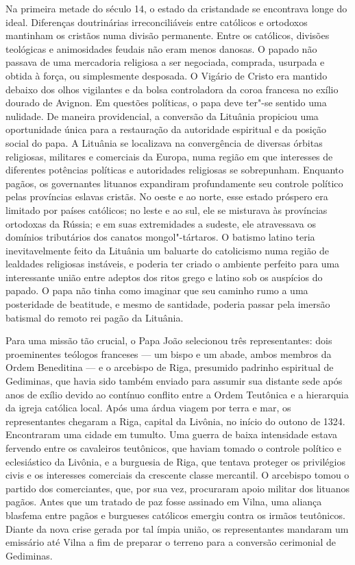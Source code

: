 Na primeira metade do século 14, o estado da cristandade se encontrava
longe do ideal. Diferenças doutrinárias irreconciliáveis entre católicos
e ortodoxos mantinham os cristãos numa divisão permanente. Entre os
católicos, divisões teológicas e animosidades feudais não eram menos
danosas. O papado não passava de uma mercadoria religiosa a ser
negociada, comprada, usurpada e obtida à força, ou simplesmente
desposada. O Vigário de Cristo era mantido debaixo dos olhos vigilantes
e da bolsa controladora da coroa francesa no exílio dourado de Avignon.
Em questões políticas, o papa deve ter"-se sentido uma nulidade. De
maneira providencial, a conversão da Lituânia propiciou uma oportunidade
única para a restauração da autoridade espiritual e da posição social do
papa. A Lituânia se localizava na convergência de diversas órbitas
religiosas, militares e comerciais da Europa, numa região em que
interesses de diferentes potências políticas e autoridades religiosas se
sobrepunham. Enquanto pagãos, os governantes lituanos expandiram
profundamente seu controle político pelas províncias eslavas cristãs. No
oeste e ao norte, esse estado próspero era limitado por países
católicos; no leste e ao sul, ele se misturava às províncias ortodoxas
da Rússia; e em suas extremidades a sudeste, ele atravessava os domínios
tributários dos canatos mongol"-tártaros. O batismo latino teria
inevitavelmente feito da Lituânia um baluarte do catolicismo numa região
de lealdades religiosas instáveis, e poderia ter criado o ambiente
perfeito para uma interessante união entre adeptos dos ritos grego e
latino sob os auspícios do papado. O papa não tinha como imaginar que
seu caminho rumo a uma posteridade de beatitude, e mesmo de santidade,
poderia passar pela imersão batismal do remoto rei pagão da Lituânia.

%

Para uma missão tão crucial, o Papa João  selecionou três
representantes: dois proeminentes teólogos franceses --- um bispo e um
abade, ambos membros da Ordem Beneditina --- e o arcebispo de Riga,
presumido padrinho espiritual de Gediminas, que havia sido também
enviado para assumir sua distante sede após anos de exílio devido ao
contínuo conflito entre a Ordem Teutônica e a hierarquia da igreja
católica local. Após uma árdua viagem por terra e mar, os representantes
chegaram a Riga, capital da Livônia, no início do outono de 1324.
Encontraram uma cidade em tumulto. Uma guerra de baixa intensidade
estava fervendo entre os cavaleiros teutônicos, que haviam tomado o
controle político e eclesiástico da Livônia, e a burguesia de Riga, que
tentava proteger os privilégios civis e os interesses comerciais da
crescente classe mercantil. O arcebispo tomou o partido dos
comerciantes, que, por sua vez, procuraram apoio militar dos lituanos
pagãos. Antes que um tratado de paz fosse assinado em Vilna, uma aliança
blasfema entre pagãos e burgueses católicos emergiu contra os irmãos
teutônicos. Diante da nova crise gerada por tal ímpia união, os
representantes mandaram um emissário até Vilna a fim de preparar o
terreno para a conversão cerimonial de Gediminas.

